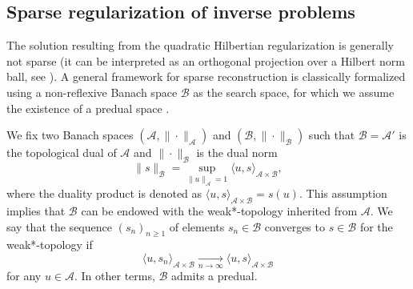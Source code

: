 \documentclass[12pt]{article}
\begin{document}
    
    \subsection{Sparse regularization of inverse problems}

    The solution resulting from the quadratic Hilbertian regularization is generally not sparse (it can be interpreted as an orthogonal projection over a Hilbert norm ball, see \cite{engl1996regularization}).
    A general framework for sparse reconstruction is classically formalized using a non-reflexive Banach space $\mathcal{B}$ as the search space, for which we assume the existence of a predual space \cite{unser2021unifying}.
    
    We fix two Banach spaces $( \mathcal{A}, \| \cdot \|_{\mathcal{A}})$ and $( \mathcal{B}, \| \cdot \|_{\mathcal{B}})$ such that $\mathcal{B} = \mathcal{A}'$ is the topological dual of $\mathcal{A}$ and $\| \cdot \|_{\mathcal{B}}$ is the dual norm 
    \begin{equation*}
        \| s \|_{\mathcal{B}} = \sup_{\|u \|_{\mathcal{A}}=1} \langle u, s \rangle_{\mathcal{A}\times\mathcal{B}}, 
    \end{equation*}
    {where the duality product is denoted as $\langle u, s \rangle_{\mathcal{A}\times\mathcal{B}} = s(u)$.}
    This assumption implies that $\mathcal{B}$ can be endowed with the weak*-topology inherited from $\mathcal{A}$. We say that the sequence $(s_n)_{n\geq 1}$ of elements $s_n \in \mathcal{B}$ converges to $s \in \mathcal{B}$ for the weak*-topology if 
    \begin{equation*}
        \langle u , s_n \rangle_{\mathcal{A}\times\mathcal{B}} \underset{n\rightarrow \infty}{\longrightarrow} \langle u, s \rangle_{\mathcal{A}\times\mathcal{B}} 
    \end{equation*}
    for any $u \in \mathcal{A}$.
    In other terms, $\mathcal{B}$ admits a predual\footnotemark.
\end{document}
